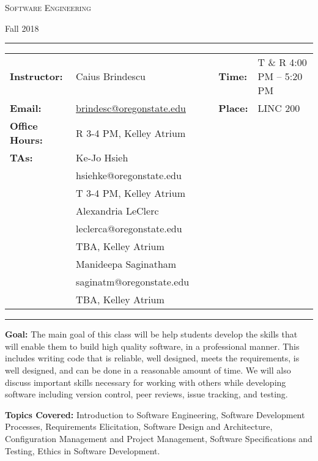\documentclass[11pt, a4paper]{article}
\begin{document}
\begin{center}
{\Large \textsc{Software Engineering}}
\end{center}
\begin{center}
Fall 2018
\end{center}

\begin{center}
\rule{6in}{0.4pt}
\begin{minipage}[t]{.8\textwidth}
\begin{tabular}{llccll}
\textbf{Instructor:} &Caius Brindescu & & & \textbf{Time:} & T \& R 4:00 PM -- 5:20 PM \\
\textbf{Email:} &  \href{mailto:brindesc@oregonstate.edu}{brindesc@oregonstate.edu} & & & \textbf{Place:} & LINC 200\\
\textbf{Office Hours:} & R 3-4 PM, Kelley Atrium &&&&\\
\textbf{TAs:} & Ke-Jo Hsieh & & & &  \\
 & hsiehke@oregonstate.edu & & & &  \\
 & T 3-4 PM, Kelley Atrium &&&&\\
 & Alexandria LeClerc &&&&  \\
 & leclerca@oregonstate.edu &&&&  \\
 & TBA, Kelley Atrium &&&&\\
 & Manideepa Saginatham &&&&  \\
 & saginatm@oregonstate.edu &&&&  \\
 & TBA, Kelley Atrium &&&&\\

\end{tabular}
\end{minipage}
\rule{6in}{0.4pt}
\end{center}
\vspace{.5cm}
\setlength{\unitlength}{1in}

\noindent\textbf{Goal:} The main goal of this class will be help students develop the skills that will enable them to build high quality software, in a professional manner.  This includes writing code that is reliable, well designed, meets the requirements, is well designed, and can be done in a reasonable amount of time.  We will also discuss important skills necessary for working with others while developing software including version control, peer reviews, issue tracking, and testing.

\noindent\textbf{Topics Covered:} Introduction to Software Engineering, Software Development Processes, Requirements Elicitation, Software Design and Architecture, Configuration Management and Project Management, Software Specifications and Testing, Ethics in Software Development.
\end{document}
